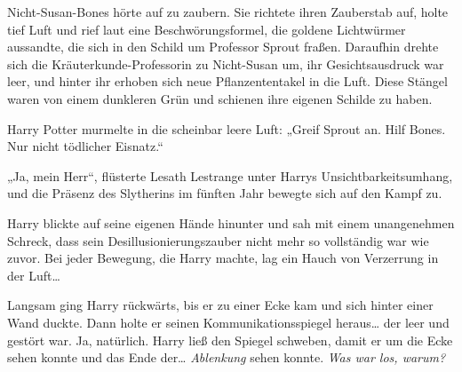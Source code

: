 Nicht-Susan-Bones hörte auf zu zaubern. Sie richtete ihren Zauberstab auf, holte tief Luft und rief laut eine Beschwörungsformel, die goldene Lichtwürmer aussandte, die sich in den Schild um Professor Sprout fraßen. Daraufhin drehte sich die Kräuterkunde-Professorin zu Nicht-Susan um, ihr Gesichtsausdruck war leer, und hinter ihr erhoben sich neue Pflanzententakel in die Luft. Diese Stängel waren von einem dunkleren Grün und schienen ihre eigenen Schilde zu haben.

Harry Potter murmelte in die scheinbar leere Luft: „Greif Sprout an. Hilf Bones. Nur nicht tödlicher Eisnatz.“

„Ja, mein Herr“, flüsterte Lesath Lestrange unter Harrys Unsichtbarkeitsumhang, und die Präsenz des Slytherins im fünften Jahr bewegte sich auf den Kampf zu.

Harry blickte auf seine eigenen Hände hinunter und sah mit einem unangenehmen Schreck, dass sein Desillusionierungszauber nicht mehr so vollständig war wie zuvor.
Bei jeder Bewegung, die Harry machte, lag ein Hauch von Verzerrung in der Luft…

Langsam ging Harry rückwärts, bis er zu einer Ecke kam und sich hinter einer Wand duckte. Dann holte er seinen Kommunikationsspiegel heraus… der leer und gestört war. Ja, natürlich. Harry ließ den Spiegel schweben, damit er um die Ecke sehen konnte und das Ende der… \emph{Ablenkung} sehen konnte.
\emph{Was war los, warum?}

